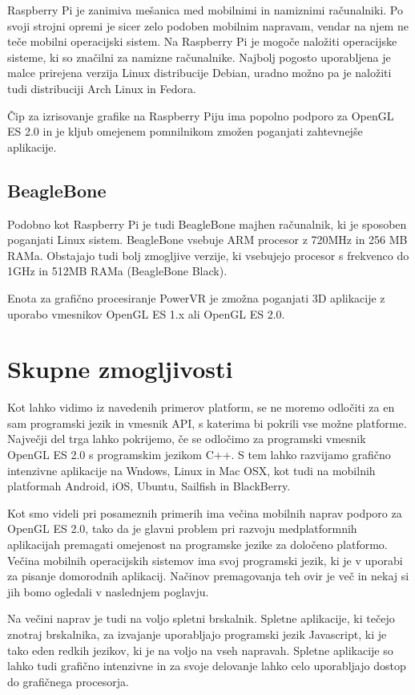 Raspberry Pi je zanimiva mešanica med mobilnimi in namiznimi računalniki. Po svoji strojni opremi je sicer zelo podoben mobilnim napravam, vendar na njem ne teče mobilni operacijski sistem. Na Raspberry Pi je mogoče naložiti operacijske sisteme, ki so značilni za namizne računalnike. Najbolj pogosto uporabljena je malce prirejena verzija Linux distribucije Debian, uradno možno pa je naložiti tudi distribuciji Arch Linux in Fedora.

Čip za izrisovanje grafike na Raspberry Piju ima popolno podporo za OpenGL ES 2.0 in je kljub omejenem pomnilnikom zmožen poganjati zahtevnejše aplikacije.

\subsection{BeagleBone}
\label{sec:beagleBone}

Podobno kot Raspberry Pi je tudi BeagleBone \cite{beagleBone} majhen računalnik, ki je sposoben poganjati Linux sistem. BeagleBone vsebuje ARM procesor z 720MHz in 256 MB RAMa. Obstajajo tudi bolj zmogljive verzije, ki vsebujejo procesor s frekvenco do 1GHz in 512MB RAMa (BeagleBone Black). 

Enota za grafično procesiranje PowerVR je zmožna poganjati 3D aplikacije z uporabo vmesnikov OpenGL ES 1.x ali OpenGL ES 2.0.

\section{Skupne zmogljivosti}

Kot lahko vidimo iz navedenih primerov platform, se ne moremo odločiti za en sam programski jezik in vmesnik API, s katerima bi pokrili vse možne platforme. Največji del trga lahko pokrijemo, če se odločimo za programski vmesnik OpenGL ES 2.0 s programskim jezikom C++. S  tem lahko razvijamo grafično intenzivne aplikacije na Wndows, Linux in Mac OSX, kot tudi na mobilnih platformah Android, iOS, Ubuntu, Sailfish in BlackBerry.

Kot smo videli pri posameznih primerih ima večina mobilnih naprav podporo za OpenGL ES 2.0, tako da je glavni problem pri razvoju medplatformnih aplikacijah premagati omejenost na programske jezike za določeno platformo. Večina mobilnih operacijskih sistemov ima svoj programski jezik, ki je v uporabi za pisanje domorodnih aplikacij. Načinov premagovanja teh ovir je več in nekaj si jih bomo ogledali v naslednjem poglavju. 

Na večini naprav je tudi na voljo spletni brskalnik. Spletne aplikacije, ki tečejo znotraj brskalnika, za izvajanje uporabljajo programski jezik Javascript, ki je tako eden redkih jezikov, ki je na voljo na vseh napravah. Spletne aplikacije so lahko tudi grafično intenzivne in za svoje delovanje lahko celo uporabljajo dostop do grafičnega procesorja.
